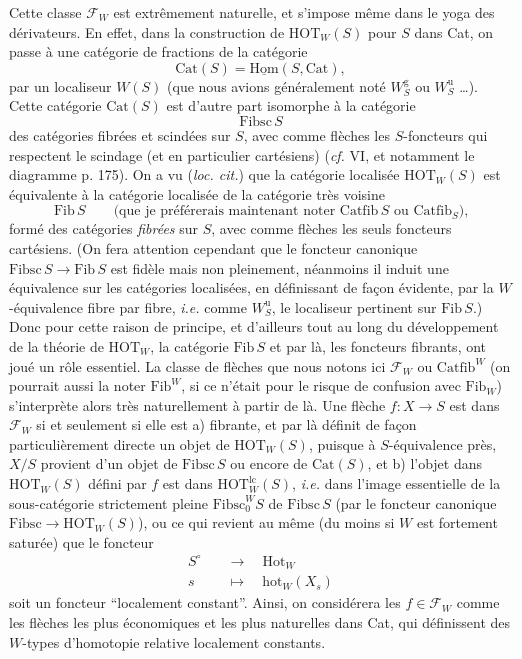 \documentclass[11pt]{article}
\newcommand{\printedpage}[1]{\marginpar{\footnotesize p.~#1}}
\newcommand{\msp}[1]{\marginpar{\footnotesize [#1]}}
\newcommand{\Cat}{\mathrm{Cat}}
\newcommand{\Fib}{\mathrm{Fib}}
\newcommand{\Catfib}{\mathrm{Catfib}}
\newcommand{\Fibsc}{\mathrm{Fibsc}}
\newcommand{\HOT}{\mathrm{HOT}}
\begin{document}
\msp{page 33}

Cette classe $\mathcal{F}_W$ est extrêmement naturelle, et s'impose même dans le yoga des dérivateurs. En effet, dans la construction de $\HOT_W(S)$ pour $S$ dans Cat, on passe à une catégorie de fractions de la catégorie
\[
\Cat(S) = \underline{\mathrm{Hom}}(S, \Cat),
\]
par un localiseur $W(S)$ (que nous avions généralement noté $W_S^{\mathrm{g}}$ ou $W_S^{\mathrm{u}}$ \ldots). Cette catégorie $\Cat(S)$ est d'autre part isomorphe à la catégorie
\[
\Fibsc\, S
\]
des catégories fibrées et scindées sur $S$, avec comme flèches les $S$-foncteurs qui respectent le scindage (et en particulier cartésiens) (\textit{cf.} VI, et notamment le diagramme p. 175). On a vu (\textit{loc. cit.}) que la catégorie localisée $\HOT_W(S)$ est équivalente à la catégorie localisée de la catégorie très voisine
\[
\Fib\, S \qquad \text{(que je préférerais maintenant noter $\Catfib\, S$ ou $\Catfib_S$),}
\]
formé des catégories \textit{fibrées} sur $S$, avec comme \msp{page 34} flèches les seuls foncteurs cartésiens. (On fera attention cependant que le foncteur canonique $\Fibsc\, S \longrightarrow \Fib\, S$ est fidèle mais non pleinement, néanmoins il induit une équivalence sur les catégories localisées, en définissant de façon évidente, par la $W$-équivalence fibre par fibre, \textit{i.e.} comme $W_S^{\mathrm{u}}$, le localiseur pertinent sur $\Fib\, S$.) Donc pour cette raison de principe, et d'ailleurs tout au long du développement de la théorie de $\HOT_W$, la catégorie $\Fib\, S$ et par là, les foncteurs fibrants, ont joué un rôle essentiel. La classe de flèches que nous notons ici $\mathcal{F}_W$ ou $\Catfib^W$ (on pourrait aussi la noter $\Fib^W$, si ce n'était pour le risque de confusion avec $\Fib_W$) s'interprète alors très naturellement à partir de là. Une flèche $f : X \longrightarrow S$ est dans $\mathcal{F}_W$ si et seulement si elle est a) fibrante, et par là définit de façon particulièrement directe un objet de $\HOT_W(S)$, puisque à $S$-équivalence près, $X/S$ provient d'un objet de $\Fibsc\, S$ ou encore de $\Cat(S)$, \msp{page 35} et b) l'objet dans $\HOT_W(S)$ défini par $f$ est dans $\HOT_W^{\mathrm{lc}}(S)$, \textit{i.e.} dans l'image essentielle de la sous-catégorie strictement pleine $\Fibsc_0^W S$ de $\Fibsc\, S$ (par le foncteur canonique
\printedpage{22}
$\Fibsc \longrightarrow \HOT_W(S)$), ou ce qui revient au même (du moins si $W$ est fortement saturée) que le foncteur %
\[
\begin{aligned}
S^{\circ} \quad &\longrightarrow \quad \mathrm{Hot}_W \\
s \quad &\longmapsto \quad \mathrm{hot}_W(X_s)
\end{aligned}
\]
soit un foncteur “localement constant”. Ainsi, on considérera les $f \in \mathcal{F}_W$ comme les flèches les plus économiques et les plus naturelles dans Cat, qui définissent des $W$-types d'homotopie relative localement constants.
\end{document}
